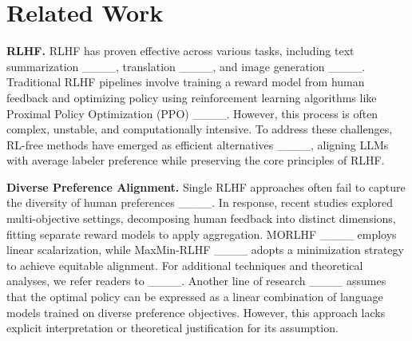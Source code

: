 \section{Related Work}
\textbf{RLHF.} RLHF has proven effective across various tasks, including text summarization ____, translation ____, and image generation ____. Traditional RLHF pipelines involve training a reward model from human feedback and optimizing policy using reinforcement learning algorithms like Proximal Policy Optimization (PPO) ____. However, this process is often complex, unstable, and computationally intensive. To address these challenges, RL-free methods have emerged as efficient alternatives ____, aligning LLMs with average labeler preference while preserving the core principles of RLHF.

\noindent 
\textbf{Diverse Preference Alignment.} 
Single RLHF approaches often fail to capture the diversity of human preferences ____. In response, recent studies explored multi-objective settings, decomposing human feedback into distinct dimensions, fitting separate reward models to apply aggregation. MORLHF ____ employs linear scalarization, while MaxMin-RLHF ____ adopts a minimization strategy to achieve equitable alignment. For additional techniques and theoretical analyses, we refer readers to ____.
Another line of research ____ assumes that the optimal policy can be expressed as a linear combination of language models trained on diverse preference objectives. However, this approach lacks explicit interpretation or theoretical justification for its assumption.

\vspace{-0.12in}